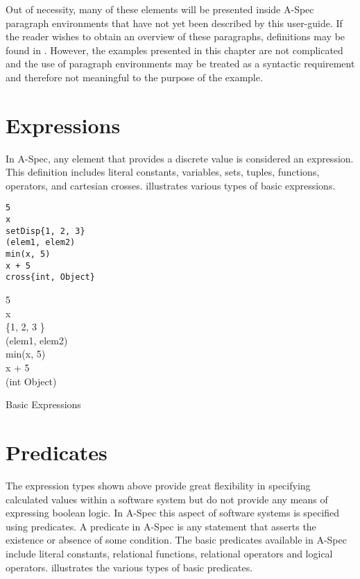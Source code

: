\documentclass[letterpaper,10pt,draft]{book}
\begin{document}
Out of necessity, many of these elements will be presented inside A-Spec paragraph
environments that have not yet been described by this user-guide.  If the reader
wishes to obtain an overview of these paragraphs, definitions may be found in .
However, the examples presented in this chapter are not complicated and the use
of paragraph environments may be treated as a syntactic requirement and therefore
not meaningful to the purpose of the example.

\section{Expressions}
   \label{sect:Expressions}

In A-Spec, any element that provides a discrete value is considered an expression.
This definition includes literal constants, variables, sets, tuples, functions,
operators, and cartesian crosses.   illustrates various types
of basic expressions.

\begin{example}
\begin{minipage}[t]{0.49\linewidth}
\begin{verbatim}
5
x
setDisp{1, 2, 3}
(elem1, elem2)
min(x, 5)
x + 5
cross{int, Object}
\end{verbatim}
\end{minipage}
\begin{minipage}[t]{0.49\linewidth}
\azed
\begin{zed}
   5 \\
   x \\
   \{1, 2, 3 \} \\
   (elem1, elem2) \\
   min(x, 5) \\
   x + 5 \\
   (int \cross Object) \\
\end{zed}
\end{minipage}

   \caption{Basic Expressions}
   \label{ex:Expressions}
\end{example}

\section{Predicates}
   \label{sect:Predicates}

The expression types shown above provide great flexibility in specifying calculated
values within a software system but do not provide any means of expressing boolean
logic.  In A-Spec this aspect of software systems is specified using predicates.
A predicate in A-Spec is any statement that asserts the existence or absence of
some condition. The basic predicates available in A-Spec include literal constants,
relational functions, relational operators and logical operators.  
illustrates the various types of basic predicates.
\end{document}

